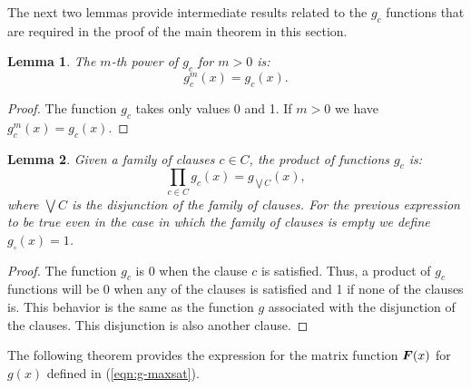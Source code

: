 \documentclass{article}
\newtheorem{lemma}{Lemma}
\def\vec#1{\mathchoice{\mbox{\boldmath$\displaystyle#1$}}
  {\mbox{\boldmath$\textstyle#1$}}
  {\mbox{\boldmath$\scriptstyle#1$}}
  {\mbox{\boldmath$\scriptscriptstyle#1$}}}
\begin{document}
The next two lemmas provide intermediate results related to the $g_c$ functions that are required in the proof of the main theorem in this section.

\begin{lemma}
\label{lem:power-g}
The $m$-th power of $g_{c}$ for $m > 0$ is:
\begin{equation}
g_{c}^m (x) = g_{c}(x) .
\end{equation}
\end{lemma}
\begin{proof}
The function $g_{c}$ takes only values 0 and 1. If $m>0$ we have $g^m_{c}(x) = g_{c}(x)$.
\end{proof}





\begin{lemma}
\label{lem:prod-g}
Given a family of clauses $c \in C$, the product of functions $g_{c}$ is:
\begin{equation}
\prod_{c \in C} g_{c} (x) = g_{\bigvee C}(x) ,
\end{equation}
where $\bigvee C$ is the disjunction of the family of clauses. For the previous expression to be true even in the case in which the family of clauses is empty we define $g_{\square}(x)=1$.
\end{lemma}
\begin{proof}
The function $g_c$ is 0 when the clause $c$ is satisfied. Thus, a product of $g_c$ functions will be 0 when any of the clauses is satisfied and 1 if none of the clauses is. This behavior is the same as the function $g$ associated with the disjunction of the clauses. This disjunction is also another clause. 
\end{proof}





The following theorem provides the expression for the matrix function $\vec{F}(x)$ for $g(x)$ defined in (\ref{eqn:g-maxsat}). 
\end{document}
